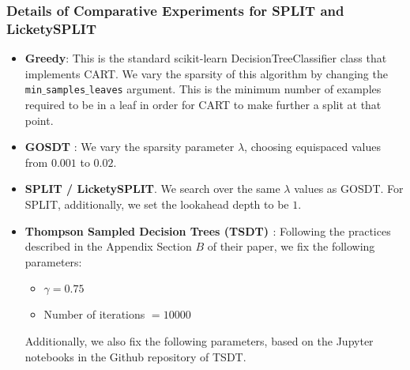 \subsubsection{Details of Comparative Experiments for SPLIT and LicketySPLIT}
\begin{itemize}
    \item \textbf{Greedy}: This is the standard scikit-learn DecisionTreeClassifier class that implements CART. We vary the sparsity of this algorithm by changing the \texttt{min$\_$samples$\_$leaves} argument. This is the minimum number of examples required to be in a leaf in order for CART to make further a split at that point. 
    \item \textbf{GOSDT} \cite{gosdt}: We vary the sparsity parameter $\lambda$, choosing equispaced values from $0.001$ to $0.02$. 
    \item \textbf{SPLIT / LicketySPLIT}. We search over the same $\lambda$ values as GOSDT. For SPLIT, additionally, we set the lookahead depth to be $1$. 
    \item \textbf{Thompson Sampled Decision Trees (TSDT) \cite{thompson_aistats}}: Following the practices described in the Appendix Section $B$ of their paper, we fix the following parameters: 
    \begin{itemize}
        \item $\gamma = 0.75$
        \item Number of iterations $= 10000$
    \end{itemize}
    Additionally, we also fix the following parameters, based on the Jupyter notebooks in the Github repository of TSDT. 


\end{itemize}
